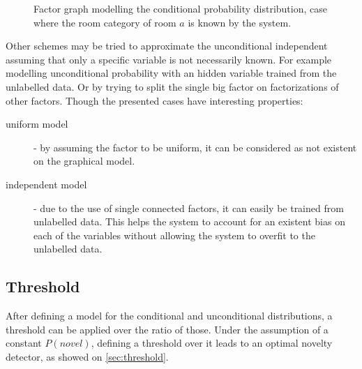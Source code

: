 \begin{figure}[h]
{
}

\caption{Factor graph modelling the conditional probability distribution, case where the
         room category of room $a$ is known by the system.}
\end{figure}
 

Other schemes may be tried to approximate the unconditional independent assuming that only
a specific variable is not necessarily known. For example modelling unconditional probability
with an hidden variable trained from the unlabelled data. Or by trying to split the single big
factor on factorizations of other factors.
Though the presented cases have interesting properties:

\begin{description}
\item[uniform model] - by assuming the factor to be uniform, it can be considered as not existent on
the graphical model.

\item[independent model] - due to the use of single connected factors, it can easily be trained from
                           unlabelled data. This helps the system to account for an existent bias on
                           each of the variables without allowing the system to overfit to the unlabelled
                           data.
\end{description}

\subsection{Threshold}
After defining a model for the conditional and unconditional distributions, a threshold can be applied
over the ratio of those.
Under the assumption of a constant $P(novel)$, defining a threshold over it leads to an optimal novelty
detector, as showed on \autoref{sec:threshold}.


